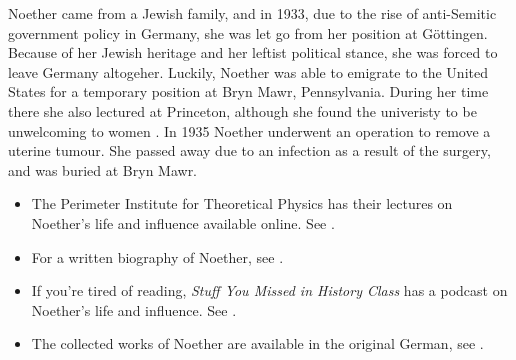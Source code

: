 \documentclass[../../../include/open-logic-section]{subfiles}
\begin{document}
Noether came from a Jewish family, and in 1933, due to the rise of
anti-Semitic government policy in Germany, she was let go from her position
at G\"{o}ttingen. Because of her Jewish heritage and her leftist political
stance, she was forced to leave Germany altogeher. Luckily, Noether was
able to emigrate to the United States for a temporary position at Bryn
Mawr, Pennsylvania. During her time there she also lectured at Princeton,
although she found the univeristy to be unwelcoming to women
\citep[81]{dick1981}. In 1935 Noether underwent an operation to remove a
uterine tumour. She passed away due to an infection as a result of the
surgery, and was buried at Bryn Mawr.

\begin{reading} 
\begin{itemize} 
\item The Perimeter Institute for
Theoretical Physics has their lectures on Noether's life and influence
available online. See \citet{Perimeter2015}.

\item For a written biography of Noether, see \citet{Dick1981}.

\item If you're tired of reading, \emph{Stuff You Missed in History Class}
has a podcast on Noether's life and influence. See \citet{History2015}.

\item The collected works of Noether are available in the original German,
see \citet{Noether1983}. 
\end{itemize} 
\end{reading}
\end{document}
